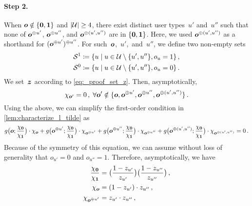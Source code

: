 \begin{proofEnd}
\begin{proofEnd}
        \paragraph{Step 2.}
        When ${\bm{o}} \notin \{{\bm{0}}, {\bm{1}}\}$ and $|{\mathcal{U}}| \ge 4$, there exist distinct user types~$u'$ and~$u''$ such that none of ${\bm{o}}^{\oplus u'}$, ${\bm{o}}^{\oplus u''}$, and ${\bm{o}}^{\oplus (u', u'')}$ are in $\{{\bm{0}}, {\bm{1}}\}$. Here, we used ${\bm{o}}^{\oplus (u', u'')}$ as a shorthand for $({\bm{o}}^{\oplus u'})^{\oplus u''}$. For such~${\bm{o}}$,~$u'$,~and~$u''$, we define two non-empty sets
        \begin{align*}
            {\mathcal{S}}^1 &\coloneqq \{u \mid u \in {\mathcal{U}} \setminus \{u', u''\}, o_u = 1\} \,,\\
            {\mathcal{S}}^0 &\coloneqq \{u \mid u \in {\mathcal{U}} \setminus \{u', u''\}, o_u = 0\} \,.
        \end{align*}
        We set~${\bm{z}}$ according to \cref{eq:_proof_set_z}. Then, asymptotically, 
        \begin{equation*}
            \chi_{{\bm{o}}'} = 0 \,, \; \forall {\bm{o}}' \notin \{{\bm{o}}, {\bm{o}}^{\oplus u'}, {\bm{o}}^{\oplus u''}, {\bm{o}}^{\oplus (u', u'')}\}
            \,.
        \end{equation*}
        Using the above, we can simplify the first-order condition in \cref{lem:characterize_l_tilde} as
        \begin{equation}
        \label{eq:_proof_four_g_terms}
            g\big({\bm{o}}; \frac{\chi_{\bm{0}}}{\chi_{\bm{1}}}\big) \cdot \chi_{\bm{o}} 
            + g\big({\bm{o}}^{\oplus u'}; \frac{\chi_{\bm{0}}}{\chi_{\bm{1}}}\big) \cdot \chi_{{\bm{o}}^{\oplus u'}} 
            + g\big({\bm{o}}^{\oplus u''}; \frac{\chi_{\bm{0}}}{\chi_{\bm{1}}}\big) \cdot \chi_{{\bm{o}}^{\oplus u''}} 
            + g\big({\bm{o}}^{\oplus (u', u'')}; \frac{\chi_{\bm{0}}}{\chi_{\bm{1}}}\big) \cdot \chi_{{\bm{o}}^{\oplus (u', u'')}} 
            = 0
            \,.
        \end{equation}
        Because of the symmetry of this equation, we can assume without loss of generality that $o_{u'} = 0$ and $o_{u''} = 1$. Therefore, asymptotically, we have
        \begin{align*}
            \frac{\chi_\vzero}{\chi_\vone} &= \big(\frac{1 - z_{u'}}{z_{u'}}\big) \big(\frac{1 - z_{u''}}{z_{u''}}\big) \,, \\
            \chi_\vo &= (1 - z_{u'}) \cdot z_{u''} \,, \\
            \chi_{\vo^{\oplus u'}} &= z_{u'} \cdot z_{u''} \,, \\

\end{align*}
\end{proofEnd}
\end{proofEnd}
